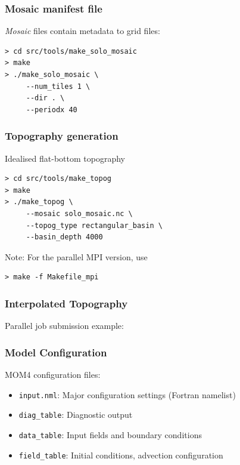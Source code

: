\documentclass[red]{beamer}
\begin{document}
\begin{frame}[fragile]
    \frametitle{Mosaic manifest file}
    
    \textit{Mosaic} files contain metadata to grid files:
    \begin{lstlisting}
> cd src/tools/make_solo_mosaic
> make
> ./make_solo_mosaic \
     --num_tiles 1 \
     --dir . \
     --periodx 40
    \end{lstlisting}
\end{frame}

\begin{frame}[fragile]
    \frametitle{Topography generation}
   
    Idealised flat-bottom topography
    \begin{lstlisting}
> cd src/tools/make_topog
> make
> ./make_topog \
     --mosaic solo_mosaic.nc \
     --topog_type rectangular_basin \
     --basin_depth 4000
    \end{lstlisting}

    Note: For the parallel MPI version, use
    \begin{lstlisting}
> make -f Makefile_mpi
    \end{lstlisting}
\end{frame}

\begin{frame}
    \frametitle{Interpolated Topography}
    
    Parallel job submission example:
    

\end{frame}
\begin{frame}
    \frametitle{Model Configuration}
    
    MOM4 configuration files:
    \begin{itemize}
        \item \lstinline|input.nml|: Major configuration settings (Fortran
            namelist)
        \item \lstinline|diag_table|: Diagnostic output
        \item \lstinline|data_table|: Input fields and boundary conditions
        \item \lstinline|field_table|: Initial conditions, advection
            configuration
    \end{itemize}
\end{frame}
\end{document}
